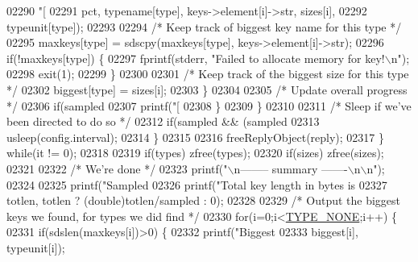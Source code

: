 \begin{DoxyCode}
{{{{{{{{{{{{{{{{{{{{{{{{{{{{{{{{{{{{{{{{{{{{{{{{{{{{{{{{{{{{{{{{{{{{{02290                    \textcolor{stringliteral}{"[%
02291                    pct, \textcolor{keyword}{typename}[type], keys->element[i]->str, sizes[i],
02292                    typeunit[type]);
02293 
02294                 \textcolor{comment}{/* Keep track of biggest key name for this type */}
02295                 maxkeys[type] = sdscpy(maxkeys[type], keys->element[i]->str);
02296                 \textcolor{keywordflow}{if}(!maxkeys[type]) \{
02297                     fprintf(stderr, \textcolor{stringliteral}{"Failed to allocate memory for key!\(\backslash\)n"});
02298                     exit(1);
02299                 \}
02300 
02301                 \textcolor{comment}{/* Keep track of the biggest size for this type */}
02302                 biggest[type] = sizes[i];
02303             \}
02304 
02305             \textcolor{comment}{/* Update overall progress */}
02306             \textcolor{keywordflow}{if}(sampled %
02307                 printf(\textcolor{stringliteral}{"[%
02308             \}
02309         \}
02310 
02311         \textcolor{comment}{/* Sleep if we've been directed to do so */}
02312         \textcolor{keywordflow}{if}(sampled && (sampled %
02313             usleep(config.interval);
02314         \}
02315 
02316         freeReplyObject(reply);
02317     \} \textcolor{keywordflow}{while}(it != 0);
02318 
02319     \textcolor{keywordflow}{if}(types) zfree(types);
02320     \textcolor{keywordflow}{if}(sizes) zfree(sizes);
02321 
02322     \textcolor{comment}{/* We're done */}
02323     printf(\textcolor{stringliteral}{"\(\backslash\)n-------- summary -------\(\backslash\)n\(\backslash\)n"});
02324 
02325     printf(\textcolor{stringliteral}{"Sampled %
02326     printf(\textcolor{stringliteral}{"Total key length in bytes is %
02327        totlen, totlen ? (\textcolor{keywordtype}{double})totlen/sampled : 0);
02328 
02329     \textcolor{comment}{/* Output the biggest keys we found, for types we did find */}
02330     \textcolor{keywordflow}{for}(i=0;i<\hyperlink{redis-cli_8c_aa47d3c2fa05e95455d76cf052f9cca68}{TYPE\_NONE};i++) \{
02331         \textcolor{keywordflow}{if}(sdslen(maxkeys[i])>0) \{
02332             printf(\textcolor{stringliteral}{"Biggest %
02333                biggest[i], typeunit[i]);
}}}}}}}}}}}}}}}}}}}}}}}}}}}}}}}}}}}}}}}}}}}}}}}}}}}}}}}}}}}}}}}}}}}}}}}}}}
\end{DoxyCode}
